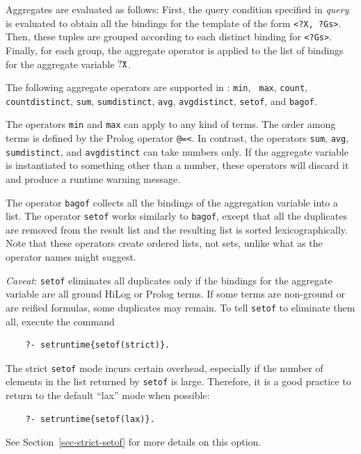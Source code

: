 \documentclass[11pt]{article}
\newcommand{\ERGO}{\mbox{\smaller{\ensuremath{\cal{E}}\smaller{{\sc{RGO}}}}}\xspace}
\newcommand{\FLSYSTEM}{\ERGO}
\begin{document}
Aggregates are evaluated as follows: First, the query
condition specified in {\it query} is evaluated to obtain all the bindings
for the template of the form {\tt \texttt{<}?X, ?Gs\texttt{>}}. Then, these
tuples are grouped according to each distinct binding for
{\tt \texttt{<}?Gs\texttt{>}}. Finally, for each group, the aggregate operator
is applied to the list of bindings for the aggregate variable $\tt ?X$.


%
The following aggregate operators are supported in \FLSYSTEM: {\tt min}, {\tt
  max}, {\tt count}, \texttt{countdistinct},
{\tt sum}, \texttt{sumdistinct},  {\tt avg}, \texttt{avgdistinct},
{\tt setof}, and {\tt bagof}. 

The operators {\tt min} and {\tt max} can apply to any kind of
terms. The order among terms is defined by the Prolog operator {\tt @=<}.  In
contrast, the operators {\tt sum}, {\tt avg}, \texttt{sumdistinct}, and
\texttt{avgdistinct} 
can take numbers only. If
the aggregate variable is instantiated to something other than a
number, these operators will discard it and produce a runtime
warning message.

The operator {\tt bagof} collects all the bindings of
the aggregation variable into a list. The operator {\tt setof} works
similarly to {\tt bagof}, except that all the duplicates are removed
from the result list and the resulting list is sorted lexicographically.
Note that these operators create ordered lists, not sets, unlike what
as the operator names might suggest.

\noindent
\emph{Caveat}: \texttt{setof} eliminates all duplicates only if the bindings for
the aggregate variable are all ground HiLog or Prolog terms. 
If some terms are non-ground or are reified formulas, some duplicates may remain.
To tell \texttt{setof} to eliminate them all, execute the command
\begin{verbatim}
    ?- setruntime{setof(strict)}.
\end{verbatim}
The strict \texttt{setof} mode incurs certain overhead, especially if the
number of elements in the list returned by \texttt{setof} is large.
Therefore, it is a good practice to return to the default ``lax'' mode when
possible:
\begin{verbatim}
    ?- setruntime{setof(lax)}.
\end{verbatim}
See Section~\ref{sec-strict-setof} for more details on this option.
\end{document}
